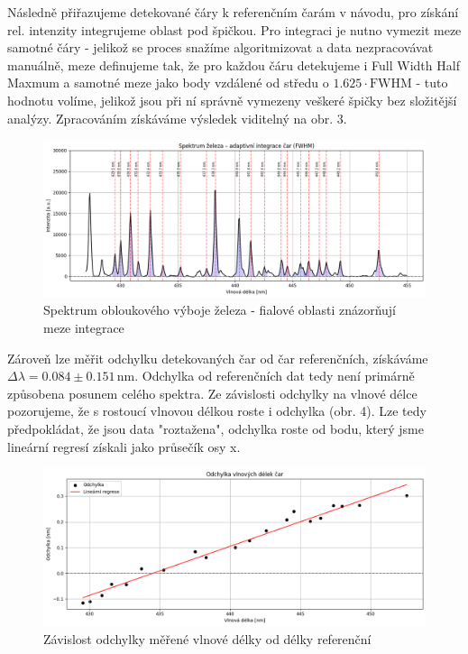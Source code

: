 \documentclass[czech,11pt,a4paper]{article}
\begin{document}
\begin{multicols}{2}
\begin{figure}[H]
		\end{figure}
		
		Následně přiřazujeme detekované čáry k referenčním čarám v návodu, pro získání rel. intenzity integrujeme oblast pod špičkou. Pro integraci je nutno vymezit meze samotné čáry - jelikož se proces snažíme algoritmizovat a data nezpracovávat manuálně, meze definujeme tak, že pro každou čáru detekujeme i Full Width Half Maxmum a samotné meze jako body vzdálené od středu o $1.625\cdot \mathrm{FWHM}$ - tuto hodnotu volíme, jelikož jsou při ní správně vymezeny veškeré špičky bez složitější analýzy. Zpracováním získáváme výsledek viditelný na obr. 3.
		\begin{figure}[H]
			\centering
			\includegraphics[width=0.9\linewidth]{spectrum3}
			\caption{Spektrum obloukového výboje železa - fialové oblasti znázorňují meze integrace}			
		\end{figure}
		Zároveň lze měřit odchylku detekovaných čar od čar referenčních, získáváme \\ $\Delta \lambda = 0.084\pm 0.151 \,\mathrm{nm}$. Odchylka od referenčních dat tedy není primárně způsobena posunem celého spektra. Ze závislosti odchylky na vlnové délce pozorujeme, že s rostoucí vlnovou délkou roste i odchylka (obr. 4). Lze tedy předpokládat, že jsou data "roztažena", odchylka roste od bodu, který jsme lineární regresí získali jako průsečík osy x.
		\begin{figure}[H]
			\centering
			\includegraphics[width=0.9\linewidth]{zavislost}
			\caption{Závislost odchylky měřené vlnové délky od délky referenční}			

\end{figure}
\end{multicols}
\end{document}
